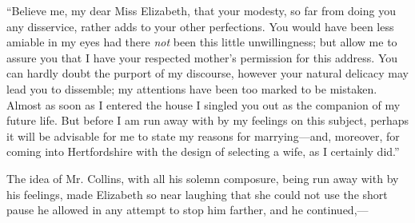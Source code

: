 \documentclass[12pt,openright]{book}
\begin{document}
“Believe me, my dear Miss Elizabeth, that your modesty, so far from doing you any disservice, rather adds to your other perfections. You would have been less amiable in my eyes had there \textit{not} been this little unwillingness; but allow me to assure you that I have your respected mother’s permission for this address. You can hardly doubt the purport of my discourse, however your natural delicacy may lead you to dissemble; my attentions have been too marked to be mistaken. Almost as soon as I entered the house I singled you out as the companion of my future life. But before I am run away with by my feelings on this subject, perhaps it will be advisable for me to state my reasons for marrying—and, moreover, for coming into Hertfordshire with the design of selecting a wife, as I certainly did.”

The idea of Mr. Collins, with all his solemn composure, being run away with by his feelings, made Elizabeth so near laughing that she could not use the short pause he allowed in any attempt to stop him farther, and he continued,—
\end{document}
